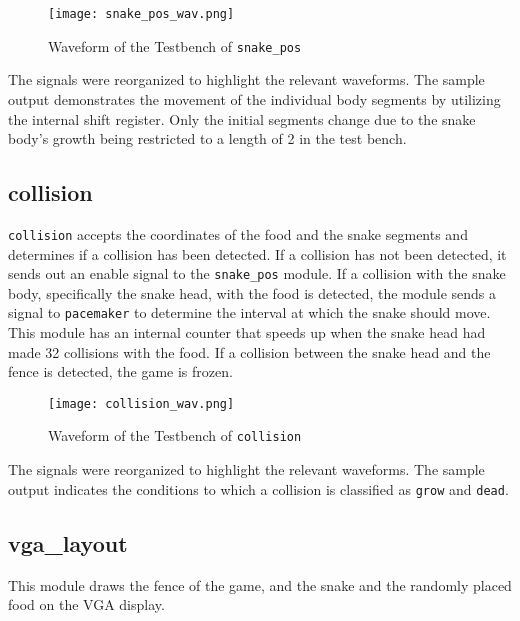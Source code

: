 \documentclass[paper=usletter, fontsize=12pt]{article}
\begin{document}
        \begin{figure}[ht]
            \begin{center}
                \texttt{[image: snake\_pos\_wav.png]}
                \caption{Waveform of the Testbench of \texttt{snake\_pos}}
                \label{fig:snake_pos_wav}
            \end{center}
        \end{figure}

        The signals were reorganized to highlight the relevant waveforms. The
        sample output demonstrates the movement of the individual body segments
        by utilizing the internal shift register. Only the initial segments
        change due to the snake body's growth being restricted to a length of 2
        in the test bench.

        \subsection{collision} \texttt{collision} accepts the coordinates of
        the food and the snake segments and determines if a collision has been
        detected. If a collision has not been detected, it sends out an enable
        signal to the \texttt{snake\_pos} module. If a collision with the snake
        body, specifically the snake head, with the food is detected, the
        module sends a signal to \texttt{pacemaker} to determine the interval
        at which the snake should move. This module has an internal counter
        that speeds up when the snake head had made 32 collisions with the
        food. If a collision between the snake head and the fence is detected,
        the game is frozen.

        \begin{figure}[ht]
            \begin{center}
                \texttt{[image: collision\_wav.png]}
                \caption{Waveform of the Testbench of \texttt{collision}}
                \label{fig:collision_wav}
            \end{center}
        \end{figure}

        The signals were reorganized to highlight the relevant waveforms. The
        sample output indicates the conditions to which a collision is
        classified as \texttt{grow} and \texttt{dead}.

        \subsection{vga\_layout} This module draws the fence of the game, and
        the snake and the randomly placed food on the VGA display.
\end{document}

